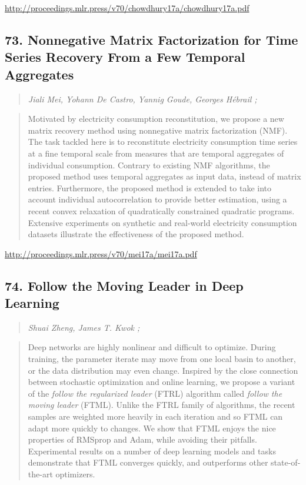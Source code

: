 \documentclass{article}
\begin{document}
\href{http://proceedings.mlr.press/v70/chowdhury17a/chowdhury17a.pdf}{http://proceedings.mlr.press/v70/chowdhury17a/chowdhury17a.pdf}

\subsection{73. Nonnegative Matrix Factorization for Time Series Recovery From a Few Temporal Aggregates}

\begin{quote}
\footnotesize{\textit{Jiali Mei, Yohann De Castro, Yannig Goude, Georges Hébrail ;}}
\end{quote}

\begin{quote}
    Motivated by electricity consumption reconstitution, we propose a new matrix recovery method using nonnegative matrix factorization (NMF). The task tackled here is to reconstitute electricity consumption time series at a fine temporal scale from measures that are temporal aggregates of individual consumption. Contrary to existing NMF algorithms, the proposed method uses temporal aggregates as input data, instead of matrix entries. Furthermore, the proposed method is extended to take into account individual autocorrelation to provide better estimation, using a recent convex relaxation of quadratically constrained quadratic programs. Extensive experiments on synthetic and real-world electricity consumption datasets illustrate the effectiveness of the proposed method.  \end{quote}

\href{http://proceedings.mlr.press/v70/mei17a/mei17a.pdf}{http://proceedings.mlr.press/v70/mei17a/mei17a.pdf}

\subsection{74. Follow the Moving Leader in Deep Learning}

\begin{quote}
\footnotesize{\textit{Shuai Zheng, James T. Kwok ;}}
\end{quote}

\begin{quote}
    Deep networks are highly nonlinear and difficult to optimize. During training, the parameter iterate may move from one local basin to another, or the data distribution may even change. Inspired by the close connection between stochastic optimization and online learning, we propose a variant of the \textit{follow the regularized leader} (FTRL) algorithm called \textit{follow the moving leader} (FTML). Unlike the FTRL family of algorithms, the recent samples are weighted more heavily in each iteration and so FTML can adapt more quickly to changes. We show that FTML enjoys the nice properties of RMSprop and Adam, while avoiding their pitfalls. Experimental results on a number of deep learning models and tasks demonstrate that FTML converges quickly, and outperforms other state-of-the-art optimizers.  \end{quote}
\end{document}
